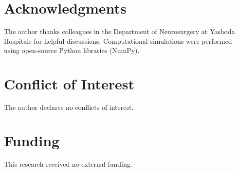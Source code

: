 \documentclass[12pt,a4paper]{article}
\begin{document}
\section*{Acknowledgments}

The author thanks colleagues in the Department of Neurosurgery at Yashoda Hospitals for helpful discussions. Computational simulations were performed using open-source Python libraries (NumPy).

\section*{Conflict of Interest}

The author declares no conflicts of interest.

\section*{Funding}

This research received no external funding.
\end{document}
